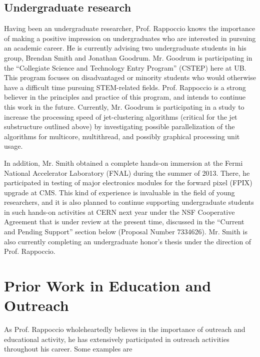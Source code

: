 \documentclass[12pt]{proposalnsf}
\begin{document}
\subsection{Undergraduate research}

Having been an undergraduate researcher, Prof. Rappoccio knows the importance
of making a positive impression on undergraduates who are interested
in pursuing an academic career. 
He is currently advising two undergraduate students in his group,
Brendan Smith and Jonathan Goodrum. Mr. Goodrum is participating in the
``Collegiate Science and Technology Entry Program'' (CSTEP) here at
UB. This program focuses on disadvantaged or minority
students who would otherwise have a difficult time pursuing
STEM-related fields. Prof. Rappoccio is a strong believer in the principles and
practice of this program, and intends to continue this work in the
future. Currently, Mr. Goodrum is participating in a study to increase
the processing speed of jet-clustering algorithms (critical for the
jet substructure outlined above) by investigating possible
parallelization of the algorithms for multicore, multithread, and
possibly graphical processing unit usage. 

In addition, Mr. Smith obtained a complete hands-on immersion at the
Fermi National Accelerator Laboratory (FNAL) during the summer of
2013. There, he participated in testing of major electronics
modules for the forward pixel (FPIX) upgrade at CMS. This kind of
experience is invaluable in the field of young researchers, and it is also
planned to continue supporting undergraduate students in such hands-on
activities at CERN next year under the NSF Cooperative Agreement that is
under review at the present time, discussed in the ``Current and
Pending Support'' section below (Proposal Number 7334626). 
Mr. Smith is also currently completing an undergraduate honor's thesis
under the direction of Prof. Rappoccio. 

\section{Prior Work in Education and Outreach}

As Prof. Rappoccio wholeheartedly believes in the importance of outreach and
educational activity, he has extensively participated in outreach
activities throughout his career. Some examples are
\end{document}
